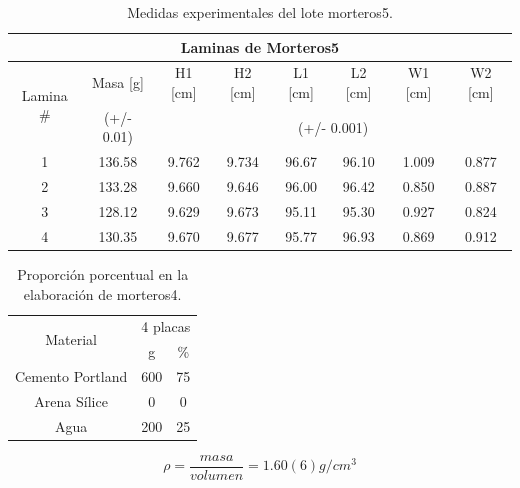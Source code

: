     \begin{table}[H]
 	\centering
 	\begin{tabular}{|c|c|c|c|c|c|c|c|}
 		\hline
 		\multicolumn{8}{|c|}{Laminas de Morteros5}                                                                             \\ \hline
 		\multirow{2}{*}{Lamina \#} & Masa {[}g{]} & H1 {[}cm{]} & H2 {[}cm{]} & L1 {[}cm{]} & L2 {[}cm{]} & W1 {[}cm{]} & W2 {[}cm{]} \\ \cline{2-8} 
 		& (+/- 0.01)   & \multicolumn{6}{c|}{(+/- 0.001)}                                                  \\ \hline 		1                          & 136.58       & 9.762          & 9.734      & 96.67         & 96.10       & 1.009       & 0.877       \\ \hline
 		2                          & 133.28       & 9.660          & 9.646      & 96.00         & 96.42       & 0.850       & 0.887       \\ \hline
 		3                          & 128.12       & 9.629          & 9.673      & 95.11         & 95.30       & 0.927       & 0.824       \\ \hline
 		4                          & 130.35       & 9.670          & 9.677      & 95.77         & 96.93       & 0.869       & 0.912       \\ \hline
 	\end{tabular}
 	\caption{Medidas experimentales del lote morteros5.}
 	\label{t:medidas-morteros5}
 \end{table}
 
 
 \begin{table}[H]
 	\centering
 	\begin{tabular}{|c|c|c|}
 		\hline
 		\multirow{2}{*}{Material} & \multicolumn{2}{c|}{4 placas} \\ \cline{2-3}
 		& g         	& \%        	\\ \hline
 		Cemento Portland      	& 600      	& 75    	\\ \hline
 		Arena Sílice         	& 0      	& 0    	\\ \hline
 		Agua                  	& 200     	& 25     	\\ \hline
 	\end{tabular}
 	\caption{Proporción porcentual en la elaboración de morteros4.}
 	\label{t:materiales-morteros5}
 \end{table}
 
 \begin{equation} \label{densidad-mor5}
 \rho=\frac{masa}{volumen}=1.60(6) g/cm^3
 \end{equation}
 
